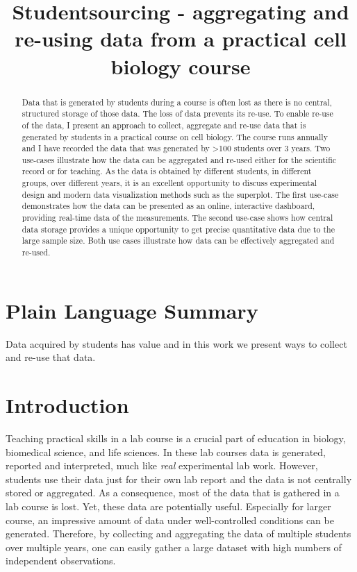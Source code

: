 \documentclass[
]{agujournal2019}
\begin{document}
\title{Studentsourcing - aggregating and re-using data from a practical
cell biology course}



\begin{abstract}
Data that is generated by students during a course is often lost as
there is no central, structured storage of those data. The loss of data
prevents its re-use. To enable re-use of the data, I present an approach
to collect, aggregate and re-use data that is generated by students in a
practical course on cell biology. The course runs annually and I have
recorded the data that was generated by \textgreater100 students over 3
years. Two use-cases illustrate how the data can be aggregated and
re-used either for the scientific record or for teaching. As the data is
obtained by different students, in different groups, over different
years, it is an excellent opportunity to discuss experimental design and
modern data visualization methods such as the superplot. The first
use-case demonstrates how the data can be presented as an online,
interactive dashboard, providing real-time data of the measurements. The
second use-case shows how central data storage provides a unique
opportunity to get precise quantitative data due to the large sample
size. Both use cases illustrate how data can be effectively aggregated
and re-used.
\end{abstract}

\section*{Plain Language Summary}
Data acquired by students has value and in this work we present ways to
collect and re-use that data.


\hypertarget{sec-introduction}{%
\section*{Introduction}\label{sec-introduction}}

Teaching practical skills in a lab course is a crucial part of education
in biology, biomedical science, and life sciences. In these lab courses
data is generated, reported and interpreted, much like \emph{real}
experimental lab work. However, students use their data just for their
own lab report and the data is not centrally stored or aggregated. As a
consequence, most of the data that is gathered in a lab course is lost.
Yet, these data are potentially useful. Especially for larger course, an
impressive amount of data under well-controlled conditions can be
generated. Therefore, by collecting and aggregating the data of multiple
students over multiple years, one can easily gather a large dataset with
high numbers of independent observations.
\end{document}
